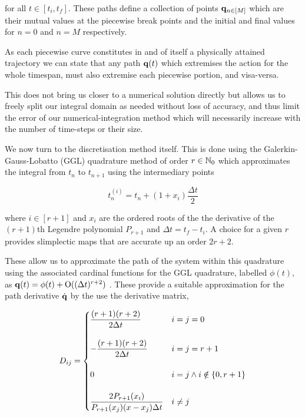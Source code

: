 for all $t \in [t_i, t_f]$. These paths define a collection of points $\vb q_{n \in [M]}$ which are their mutual values at the piecewise break points and the initial and final values for $n = 0$ and $n = M$ respectively.

As each piecewise curve constitutes in and of itself a physically attained trajectory we can state that any path $\vb{q}(t)$ which extremises the action for the whole timespan, must also extremise each piecewise portion, and visa-versa. 

This does not bring us closer to a numerical solution directly but allows us to freely split our integral domain as needed without loss of accuracy, and thus limit the error of our numerical-integration method which will necessarily increase with the number of time-steps or their size.

We now turn to the discretisation method itself. This is done using the Galerkin-Gauss-Lobatto (GGL) quadrature method of order $r \in \mathbb{N}_0$\cite{tsangSLIMPLECTICINTEGRATORSVARIATIONAL2015, farrVariationalIntegratorsGravitational2007} which approximates the integral from $t_n$ to $t_{n + 1}$ using the intermediary points

\begin{equation}
  t^{(i)}_n = t_n + (1 + x_i)\frac{\Delta t}{2}
\end{equation}

where $i \in [r + 1]$ and $x_i$ are the ordered roots of the the derivative of the $(r + 1)$th Legendre polynomial $P_{r + 1}$ and $\Delta t = t_f - t_i$. A choice for a given $r$ provides slimplectic maps that are accurate up an order $2r + 2$.

These allow us to approximate the path of the system within this quadrature using the associated cardinal functions for the GGL quadrature, labelled $\phi(t)$, as \(\vb q(t) = \phi(t) + \mathord{\mathrm{O}}((\Delta t)^{r + 2})\) . These provide a suitable approximation for the path derivative $\dot{\vb q}$ by the use the derivative matrix,

\begin{equation}
  D_{ij} = \begin{cases}
  	\dfrac{(r + 1)(r + 2)}{2\Delta t} &i = j = 0 \\\\
  	-\dfrac{(r + 1)(r + 2)}{2\Delta t} & i = j = r + 1 \\\\
  	0 & i = j \land i \notin \left\{0, r + 1\right\} \\\\
  	\dfrac{2P_{r + 1}(x_i)}{P_{r+1}(x_j)(x - x_j)\Delta t} & i\neq j
  \end{cases}
\end{equation}

